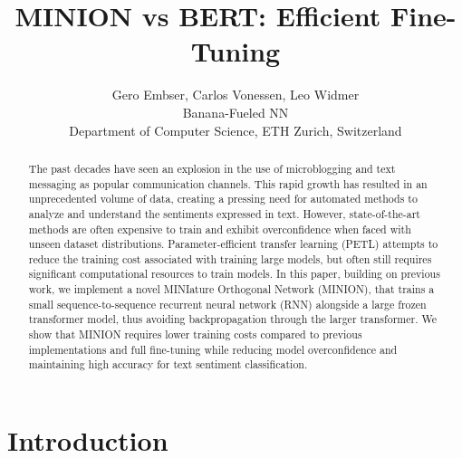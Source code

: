 \documentclass[10pt,conference,compsocconf]{IEEEtran}
\begin{document}
\title{MINION vs BERT: Efficient Fine-Tuning}

\author{
  Gero Embser, Carlos Vonessen, Leo Widmer\\
  Banana-Fueled NN\\
  Department of Computer Science, ETH Zurich, Switzerland
}

\maketitle

\begin{abstract}
The past decades have seen an explosion in the use of microblogging and text messaging as popular communication channels. This rapid growth has resulted in an unprecedented volume of data, creating a pressing need for automated methods to analyze and understand the sentiments expressed in text. However, state-of-the-art methods are often expensive to train and exhibit overconfidence when faced with unseen dataset distributions. Parameter-efficient transfer learning (PETL) attempts to reduce the training cost associated with training large models, but often still requires significant computational resources to train models. In this paper, building on previous work, we implement a novel MINIature Orthogonal Network (MINION), that trains a small sequence-to-sequence recurrent neural network (RNN) alongside a large frozen transformer model, thus avoiding backpropagation through the larger transformer. We show that MINION requires lower training costs compared to previous implementations and full fine-tuning while reducing model overconfidence and maintaining high accuracy for text sentiment classification.

\end{abstract}

\section{Introduction}
\end{document}
